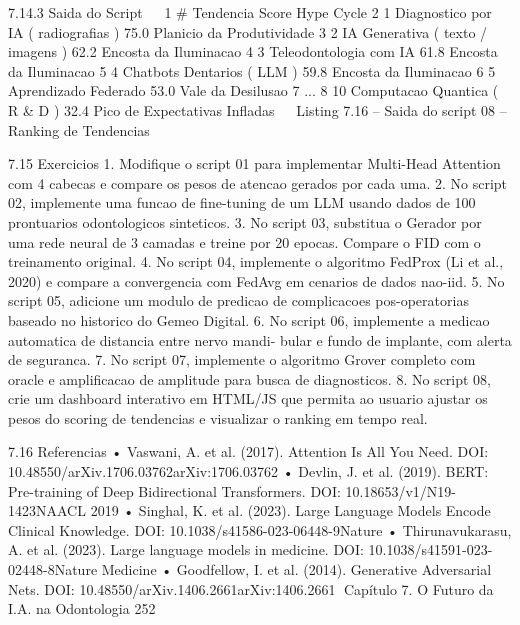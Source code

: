     7.14.3     Saida do Script
                                                                                             
1       # Tendencia                                 Score Hype Cycle
2       1 Diagnostico por IA ( radiografias )      75.0   Planicio da Produtividade
3       2 IA Generativa ( texto / imagens )        62.2   Encosta da Iluminacao
4       3 Teleodontologia com IA                   61.8   Encosta da Iluminacao
5       4 Chatbots Dentarios ( LLM )              59.8   Encosta da Iluminacao
6       5 Aprendizado Federado                     53.0   Vale da Desilusao
7       ...
8       10 Computacao Quantica ( R & D )           32.4   Pico de Expectativas Infladas
                                                                                             
                   Listing 7.16 – Saida do script 08 – Ranking de Tendencias


    7.15       Exercicios
        1. Modifique o script 01 para implementar Multi-Head Attention com 4 cabecas e
           compare os pesos de atencao gerados por cada uma.
        2. No script 02, implemente uma funcao de fine-tuning de um LLM usando dados
           de 100 prontuarios odontologicos sinteticos.
        3. No script 03, substitua o Gerador por uma rede neural de 3 camadas e treine por
           20 epocas. Compare o FID com o treinamento original.
        4. No script 04, implemente o algoritmo FedProx (Li et al., 2020) e compare a
           convergencia com FedAvg em cenarios de dados nao-iid.
        5. No script 05, adicione um modulo de predicao de complicacoes pos-operatorias
           baseado no historico do Gemeo Digital.
        6. No script 06, implemente a medicao automatica de distancia entre nervo mandi-
           bular e fundo de implante, com alerta de seguranca.
        7. No script 07, implemente o algoritmo Grover completo com oracle e amplificacao
           de amplitude para busca de diagnosticos.
        8. No script 08, crie um dashboard interativo em HTML/JS que permita ao usuario
           ajustar os pesos do scoring de tendencias e visualizar o ranking em tempo real.


    7.16       Referencias
         • Vaswani, A. et al.     (2017).     Attention Is All You Need.              DOI:
           10.48550/arXiv.1706.03762arXiv:1706.03762
         • Devlin, J. et al. (2019). BERT: Pre-training of Deep Bidirectional Transformers.
           DOI: 10.18653/v1/N19-1423NAACL 2019
         • Singhal, K. et al. (2023). Large Language Models Encode Clinical Knowledge.
           DOI: 10.1038/s41586-023-06448-9Nature
         • Thirunavukarasu, A. et al. (2023). Large language models in medicine. DOI:
           10.1038/s41591-023-02448-8Nature Medicine
         • Goodfellow, I. et al.   (2014).    Generative Adversarial Nets.            DOI:
           10.48550/arXiv.1406.2661arXiv:1406.2661
Capítulo 7. O Futuro da I.A. na Odontologia                                           252


